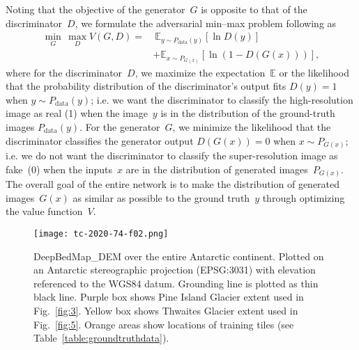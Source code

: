 \documentclass[tc, noline]{copernicus}
\begin{document}
Noting that the objective of the generator~$G$ is opposite to that of the discriminator~$D$, we formulate the adversarial min--max problem following
\citet{GoodfellowGenerativeAdversarialNetworks2014} as
\begin{equation}\label{eq:4}
\begin{split}
\min_{G}\,\max_{D} V(G,D) =&~\mathbb{E}_{y \sim P_{\text{data}}(y)}[\ln D(y)]\\&+ \mathbb{E}_{x \sim P_{G(x)}}[\ln(1-D(G(x)))],
\end{split}
\end{equation}
where for the discriminator~$D$, we maximize the expectation~$\mathbb{E}$ or the likelihood that the probability distribution of the discriminator's
output fits $D(y)=1$ when $y \sim P_{\text{data}}(y)$; i.e. we want the discriminator to classify the high-resolution image as real (1) when the
image~$y$ is in the distribution of the ground-truth images $P_{\text{data}}(y)$. For the generator~$G$, we minimize the likelihood that the
discriminator classifies the generator output $D(G(x))=0$ when $x \sim P_{G(x)}$; i.e. we do not want the discriminator to classify the super-resolution image as fake~(0) when the inputs~$x$ are in the distribution of generated images~$P_{G(x)}$. The overall goal of the entire network is to
make the distribution of generated images~$G(x)$ as similar as possible to the ground truth~$y$ through optimizing the value function~$V$.

\begin{figure*}[t]
\texttt{[image: tc-2020-74-f02.png]}
\caption{DeepBedMap\_DEM over the entire Antarctic continent. Plotted on an Antarctic stereographic projection (EPSG:3031) with elevation referenced to the WGS84 datum. Grounding line is plotted as thin black line. Purple box shows Pine Island Glacier extent used in Fig.~\ref{fig:3}. Yellow box shows Thwaites Glacier extent used in Fig.~\ref{fig:5}. Orange areas show locations of training tiles (see Table~\ref{table:groundtruthdata}).}
\label{fig:2}
\end{figure*}
\end{document}

